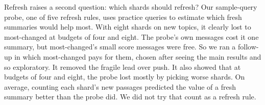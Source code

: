 Refresh raises a second question: which shards should refresh?
Our sample-query probe, one of five refresh rules, uses practice queries to estimate which fresh summaries would help most.
With eight shards on new topics, it clearly lost to most-changed at budgets of four and eight.
The probe's own messages cost it one summary, but most-changed's small score messages were free.
So we ran a follow-up in which most-changed pays for them, chosen after seeing the main results and so exploratory.
It removed the fragile lead over push.
It also showed that at budgets of four and eight, the probe lost mostly by picking worse shards.
On average, counting each shard's new passages predicted the value of a fresh summary better than the probe did.
We did not try that count as a refresh rule.
